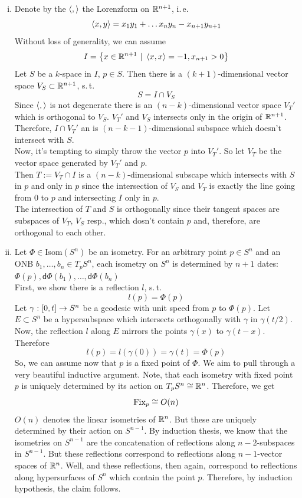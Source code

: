 \documentclass{book}
\renewcommand{\d}{\textsf{d}}
\begin{document}
\begin{Beweis}{}
	\begin{enumerate}[(i)]
		\item Denote by the $\left<,\right>$ the Lorenzform on $\mathbb{R}^{n+1}$, i.\,e.
		\[ \left<x,y\right> = x_1y_1 + \ldots x_ny_n - x_{n+1} y_{n+1} \]
		Without loss of generality, we can assume
		\[ I = \set{x \in \R^{n+1}}{\shrp{x,x} = -1, x_{n+1} > 0} \]
		Let $S$ be a $k$-space in $I$, $p \in S$. Then there is a $(k+1)$-dimensional vector space $V_S \subset \mathbb{R}^{n+1}$, s.\,t.
		\[ S = I \cap V_S \]
		Since $\left<,\right>$ is not degenerate there is an $(n - k)$-dimensional vector space $V_T'$ which is orthogonal to $V_S$. $V_T'$ and $V_S$ intersects only in the origin of $\mathbb{R}^{n+1}$. Therefore, $I \cap V_T'$ an is $(n-k-1)$-dimensional subspace which doesn't intersect with $S$.\\
		Now, it's tempting to simply throw the vector $p$ into $V_T'$. So let $V_T$ be the vector space generated by $V_T'$ and $p$.\\
		Then $T := V_T \cap I$ is a $(n - k)$-dimensional subscape which intersects with $S$ in $p$ and only in $p$ since the intersection of $V_S$ and $V_T$ is exactly the line going from $0$ to $p$ and intersecting $I$ only in $p$.\\
		The intersection of $T$ and $S$ is orthogonally since their tangent spaces are subspaces of $V_T$, $V_S$ resp., which dosn't contain $p$ and, therefore, are orthogonal to each other.
		\item Let $\Phi \in $Isom$(S^n)$ be an isometry. For an arbitrary point $p \in S^n$ and an ONB $b_1,\ldots, b_n \in T_pS^n$, each isometry on $S^n$ is determined by $n+1$ dates: $\Phi(p), \d \Phi(b_1), \ldots, \d \Phi(b_n)$\\
		First, we show there is a reflection $l$, s.\,t.
		\[ l(p) = \Phi(p) \]
		Let $\gamma : [0,t] \overset{}{\rightarrow} S^n$ be a geodesic with unit speed from $p$ to $\Phi(p)$. Let $E \subset S^n$ be a hypersubspace which intersects orthogonally with $\gamma$ in $\gamma(t/2)$. Now, the reflection $l$ along $E$ mirrors the points $\gamma(x)$ to $\gamma(t - x)$. Therefore
		\[ l(p) = l(\gamma(0)) = \gamma(t) = \Phi(p) \]
		So, we can assume now that $p$ is a fixed point of $\Phi$. We aim to pull through a very beautiful inductive argument. Note, that each isometry with fixed point $p$ is uniquely determined by its action on $T_pS^n \overset{}{\cong} \mathbb{R}^n$. Therefore, we get
		\[ \text{Fix}_p \overset{}{\cong} O(n) \]
		$O(n)$ denotes the linear isometries of $\mathbb{R}^{n}$. But these are uniquely determined by their action on $S^{n-1}$. By induction thesis, we know that the isometries on $S^{n-1}$ are the concatenation of reflections along $n-2$-subspaces in $S^{n-1}$. But these reflections correspond to reflections along $n-1$-vector spaces of $\mathbb{R}^n$. Well, and these reflections, then again, correspond to reflections along hypersurfaces of $S^n$ which contain the point $p$. Therefore, by induction hypothesis, the claim follows.

\end{enumerate}
\end{Beweis}
\end{document}
